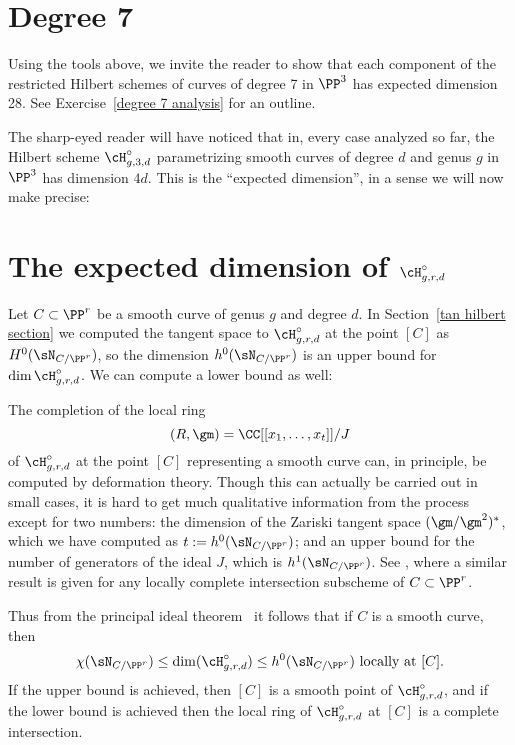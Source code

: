 \section{Degree 7}

Using the tools above, we invite the reader to show that each component of the restricted Hilbert schemes of curves of degree 7
in $\PP^3$ has expected dimension 28. See Exercise~\ref{degree 7 analysis} for an outline.


The sharp-eyed reader will have noticed that in, every case analyzed so far,  the Hilbert scheme
$\cH^\circ_{g,3,d}$ parametrizing smooth curves of degree $d$ and genus $g$ in $\PP^3$ has dimension $4d$. 
 This is the ``expected dimension'',  in a sense we will now make precise:
 
\section{The expected dimension of $\cH^\circ_{g,r,d}$}\label{chi N}

Let $C\subset \PP^r$ be a smooth curve of genus $g$ and degree $d$. In Section~\ref{tan hilbert section}
we computed the tangent space to $\cH^\circ_{g,r,d}$ at the point $[C]$ as $H^0(\sN_{C/\PP^r})$, so 
the dimension $h^0( \sN_{C/\PP^r})$ is an upper bound for $\dim \cH^\circ_{g,r,d}$. We can compute a lower bound as well:


\begin{fact}\label{deformation bound}
The completion of the local ring 
$$
(R,\gm) = \CC[[ x_1,\dots, x_t]]/J
$$ 
of $\cH^\circ_{g,r,d}$ at the point $[C]$ representing a smooth curve can, in principle, be computed by deformation theory.
Though this can actually be carried out in small cases, it is hard to get much qualitative information from the process
except for two numbers: the dimension of the Zariski tangent space $(\gm/\gm^{2})^{*}$, which we have computed as 
$t:= h^0(\sN_{C/\PP^r})$; 
and an upper bound for the number of generators of the ideal $J$, which is 
$h^1(\sN_{C/\PP^r})$. See
\cite[Corollaries 6.2.5, 6.4.11 and Proposition 6.5.2]{MR2223408}, where a similar result is given for any
locally complete intersection subscheme of $C\subset \PP^r$.

Thus from the principal ideal theorem~\cite[Theorem 10.2]{Eisenbud1995} it follows that if $C$ is a smooth curve, then 
$$
\chi(\sN_{C/\PP^r}) \leq \dim (\cH^\circ_{g,r,d})\leq h^0(\sN_{C/\PP^r}) \hbox{ locally at } [C].
$$
If the upper bound is achieved, then $[C]$ is a smooth point of $\cH^\circ_{g,r,d}$, and if the lower bound is achieved
then the local ring of $\cH^\circ_{g,r,d}$ at $[C]$ is a complete intersection.
\end{fact}

